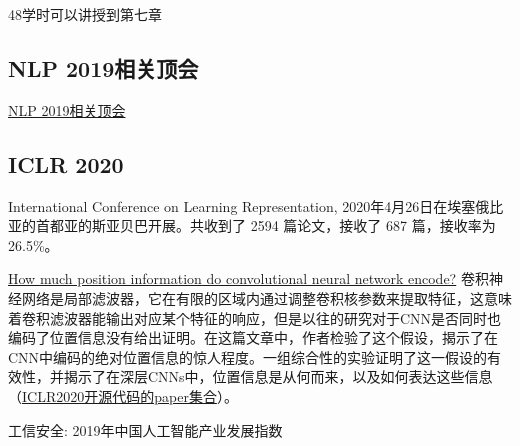 \begin{pre}
48学时可以讲授到第七章

\subsection{NLP 2019相关顶会}
\href{https://github.com/zggl/NLP-Conferences-Code}{NLP 2019相关顶会}

\subsection{ICLR 2020}
International Conference on Learning Representation, 2020年4月26日在埃塞俄比亚的首都亚的斯亚贝巴开展。共收到了 2594 篇论文，接收了 687 篇，接收率为 26.5\%。

\href{https://openreview.net/forum?id=rJeB36NKvB}{How much position information do convolutional neural network encode?}
卷积神经网络是局部滤波器，它在有限的区域内通过调整卷积核参数来提取特征，这意味着卷积滤波器能输出对应某个特征的响应，但是以往的研究对于CNN是否同时也编码了位置信息没有给出证明。在这篇文章中，作者检验了这个假设，揭示了在CNN中编码的绝对位置信息的惊人程度。一组综合性的实验证明了这一假设的有效性，并揭示了在深层CNNs中，位置信息是从何而来，以及如何表达这些信息（\href{https://www.paperdigest.org/2019/12/iclr-2020-papers-with-code/}{ICLR2020开源代码的paper集合}）。

工信安全: 2019年中国人工智能产业发展指数
\end{pre} 